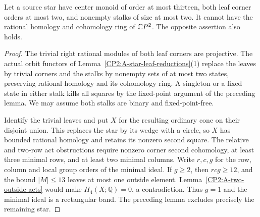 \begin{theorem}
\label{CP2:A-star-thirteen-two-binary-stalks}
Let a source star have center monoid of order at most thirteen,
both leaf corner orders at most two, and nonempty stalks of
size at most two. It cannot have the rational homology and
cohomology ring of $\mathbb{C}P^2$. The opposite assertion also holds.
\end{theorem}
\begin{proof}
The trivial right rational modules of both leaf corners are
projective. The actual orbit functors of
Lemma~\ref{CP2:A-star-leaf-reductions}(1) replace the leaves by
trivial corners and the stalks by nonempty sets of at most two
states, preserving rational homology and its cohomology ring.
A singleton or a fixed state in either stalk kills all squares
by the fixed-point argument of the preceding lemma. We may
assume both stalks are binary and fixed-point-free.

Identify the trivial leaves and put $X$ for the resulting
ordinary cone on their disjoint union. This replaces the star
by its wedge with a circle, so $X$ has bounded rational
homology and retains its nonzero second square. The relative
and two-row act obstructions require nonzero corner second
cohomology, at least three minimal rows, and at least two
minimal columns. Write $r,c,g$ for the row, column and local
group orders of the minimal ideal. If $g\geq2$, then
$rcg\geq12$, and the bound $|M|\leq13$ leaves at most one
outside element. Lemma~\ref{CP2:A-two-outside-acts} would make
$H_4(X;\mathbb Q)=0$, a contradiction. Thus $g=1$ and the
minimal ideal is a rectangular band. The preceding lemma
excludes precisely the remaining star.
\end{proof}

